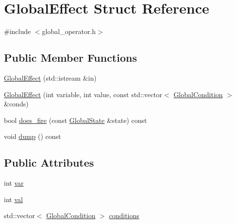 \hypertarget{structGlobalEffect}{\section{Global\-Effect Struct Reference}
\label{structGlobalEffect}
}


{\ttfamily \#include $<$global\-\_\-operator.\-h$>$}

\subsection*{Public Member Functions}
\begin{DoxyCompactItemize}
\item 
\hyperlink{structGlobalEffect_a509f6623f969bf5a6ed00931efb58ae9}{Global\-Effect} (std\-::istream \&in)
\item 
\hyperlink{structGlobalEffect_a675ffd9bf795b8681f5942e842e5f746}{Global\-Effect} (int variable, int value, const std\-::vector$<$ \hyperlink{structGlobalCondition}{Global\-Condition} $>$ \&conds)
\item 
bool \hyperlink{structGlobalEffect_af1f916d79e074b7a8abf058215a4ac77}{does\-\_\-fire} (const \hyperlink{classGlobalState}{Global\-State} \&state) const 
\item 
void \hyperlink{structGlobalEffect_ac0d19a4eab9755bdb12990c41833399d}{dump} () const 
\end{DoxyCompactItemize}
\subsection*{Public Attributes}
\begin{DoxyCompactItemize}
\item 
int \hyperlink{structGlobalEffect_ac5522c9eeb833d58b1732eeaf71b2fd2}{var}
\item 
int \hyperlink{structGlobalEffect_a766fc149861b8665ca09131ff788fb4c}{val}
\item 
std\-::vector$<$ \hyperlink{structGlobalCondition}{Global\-Condition} $>$ \hyperlink{structGlobalEffect_a5fc56e03c5b64903363308beeee7945a}{conditions}
\end{DoxyCompactItemize}


